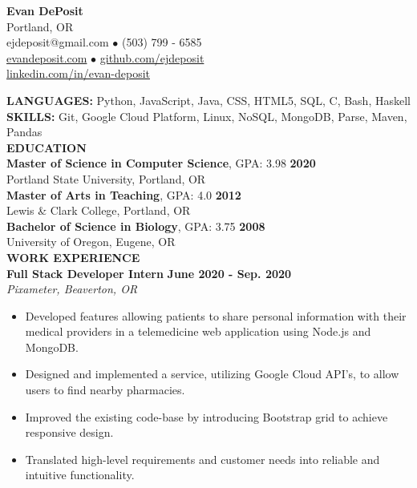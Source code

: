 \documentclass[11pt]{article}
\begin{document}
\thispagestyle{empty}
\begin{center}
\noindent \Large{\textbf{Evan DePosit}}\\
\large{Portland, OR}\\
\large{ejdeposit@gmail.com $\bullet$ (503) 799 - 6585}\\
\href{http://evandeposit.com}{\large{evandeposit.com}} $\bullet$
\href{http://github.com/ejdeposit}{\large{github.com/ejdeposit}}\\
\href{http://www.linkedin.com/in/evan-deposit}{\large{linkedin.com/in/evan-deposit}}
\end{center}
\medskip
\textbf{LANGUAGES:} Python, JavaScript, Java, CSS, HTML5, SQL, C, Bash, Haskell\medskip \\
\textbf{SKILLS:} Git, Google Cloud Platform, Linux,  NoSQL, MongoDB, Parse, Maven, Pandas\bigskip\\
\noindent
\makebox[0pt][l]{\rule[-.2\baselineskip]{\linewidth}{.3mm}}%
\large{\textbf{EDUCATION}} \smallskip \\
%
\textbf{Master of Science in Computer Science}, GPA: 3.98
\hfill \textbf{2020}\\ 
Portland State University, Portland, OR
\medskip \\
%
\textbf{Master of Arts in Teaching}, GPA: 4.0
\hfill \textbf{2012}\\
Lewis \& Clark College, Portland, OR
\medskip \\
%
\textbf{Bachelor of Science in Biology}, GPA: 3.75
\hfill \textbf{2008}\\
University of Oregon, Eugene, OR
\bigskip\\
\makebox[0pt][l]{\rule[-.2\baselineskip]{\linewidth}{.3mm}}%
\large{\textbf{WORK EXPERIENCE}}\smallskip \\
%
\textbf{Full Stack Developer Intern} \hfill \textbf{June 2020 - Sep. 2020}\\
\textsl{Pixameter, Beaverton, OR} 
\begin{itemize}[leftmargin=*, itemsep=0pt, topsep=5pt]
	\item Developed features allowing patients to share personal information with their medical providers in a telemedicine web application using Node.js and MongoDB.
	\item Designed and implemented a service, utilizing Google Cloud API's, to allow users to find nearby pharmacies.
	\item Improved the existing code-base by introducing Bootstrap grid to achieve responsive design.
	\item Translated high-level requirements and customer needs into reliable and intuitive functionality.
\end{itemize}
\end{document}
